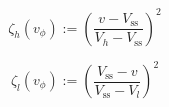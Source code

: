\begin{equation}
	\zeta_h(v_\phi) := \left(\frac{v-V_\text{ss}}{V_h-V_\text{ss}}\right)^{2}
	\label{ch1:equ:high-voltage-threshold-cost-simple}
\end{equation}

\begin{equation}
	\zeta_l(v_\phi) := \left(\frac{V_\text{ss}-v}{V_\text{ss}-V_l}\right)^{2}
	\label{ch1:equ:low-voltage-threshold-cost-simple}
\end{equation}